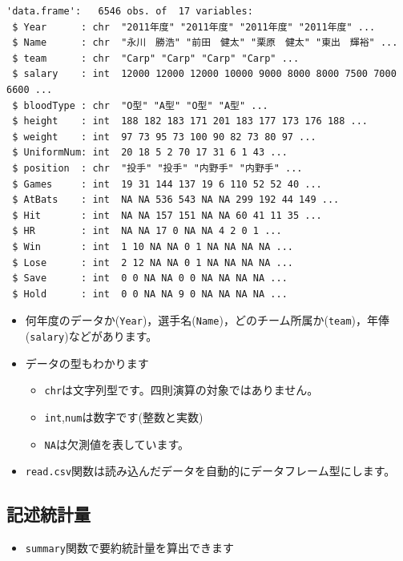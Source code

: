 \documentclass[
  a4paper,
]{ltjsbook}
\providecommand{\tightlist}{%
  \setlength{\itemsep}{0pt}\setlength{\parskip}{0pt}}\usepackage{longtable,booktabs,array}
\begin{document}
\begin{verbatim}
'data.frame':   6546 obs. of  17 variables:
 $ Year      : chr  "2011年度" "2011年度" "2011年度" "2011年度" ...
 $ Name      : chr  "永川　勝浩" "前田　健太" "栗原　健太" "東出　輝裕" ...
 $ team      : chr  "Carp" "Carp" "Carp" "Carp" ...
 $ salary    : int  12000 12000 12000 10000 9000 8000 8000 7500 7000 6600 ...
 $ bloodType : chr  "O型" "A型" "O型" "A型" ...
 $ height    : int  188 182 183 171 201 183 177 173 176 188 ...
 $ weight    : int  97 73 95 73 100 90 82 73 80 97 ...
 $ UniformNum: int  20 18 5 2 70 17 31 6 1 43 ...
 $ position  : chr  "投手" "投手" "内野手" "内野手" ...
 $ Games     : int  19 31 144 137 19 6 110 52 52 40 ...
 $ AtBats    : int  NA NA 536 543 NA NA 299 192 44 149 ...
 $ Hit       : int  NA NA 157 151 NA NA 60 41 11 35 ...
 $ HR        : int  NA NA 17 0 NA NA 4 2 0 1 ...
 $ Win       : int  1 10 NA NA 0 1 NA NA NA NA ...
 $ Lose      : int  2 12 NA NA 0 1 NA NA NA NA ...
 $ Save      : int  0 0 NA NA 0 0 NA NA NA NA ...
 $ Hold      : int  0 0 NA NA 9 0 NA NA NA NA ...
\end{verbatim}

\begin{itemize}
\tightlist
\item
  何年度のデータか(\texttt{Year})，選手名(\texttt{Name})，どのチーム所属か(\texttt{team})，年俸(\texttt{salary})などがあります。
\item
  データの型もわかります

  \begin{itemize}
  \tightlist
  \item
    \texttt{chr}は文字列型です。四則演算の対象ではありません。
  \item
    \texttt{int},\texttt{num}は数字です(整数と実数)
  \item
    \texttt{NA}は欠測値を表しています。
  \end{itemize}
\item
  \texttt{read.csv}関数は読み込んだデータを自動的にデータフレーム型にします。
\end{itemize}

\subsection{記述統計量}\label{ux8a18ux8ff0ux7d71ux8a08ux91cf}

\begin{itemize}
\tightlist
\item
  \texttt{summary}関数で要約統計量を算出できます
\end{itemize}
\end{document}
